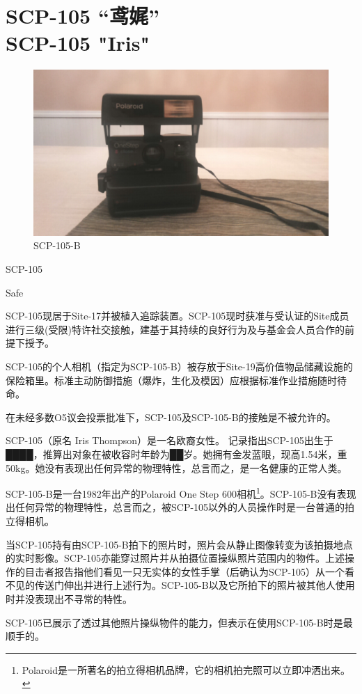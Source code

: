 \chapter[SCP-105 “鸢娓”]{
    SCP-105 “鸢娓”\\
    SCP-105 "Iris"
}

\label{chap:SCP-105}

\begin{figure}[H]
    \centering
    \includegraphics[width=0.5\linewidth]{images/SCP-105.jpg}
    \caption*{SCP-105-B}
\end{figure}

SCP-105

Safe

SCP-105现居于Site-17并被植入追踪装置。SCP-105现时获准与受认证的Site成员进行三级(受限)特许社交接触，建基于其持续的良好行为及与基金会人员合作的前提下授予。

SCP-105的个人相机（指定为SCP-105-B）被存放于Site-19高价值物品储藏设施的保险箱里。标准主动防御措施（爆炸，生化及模因）应根据标准作业措施随时待命。

在未经多数O5议会投票批准下，SCP-105及SCP-105-B的接触是不被允许的。

SCP-105（原名 Iris Thompson）是一名欧裔女性。 记录指出SCP-105出生于████，推算出对象在被收容时年龄为██岁。她拥有金发蓝眼，现高1.54米，重50kg。她没有表现出任何异常的物理特性，总言而之，是一名健康的正常人类。

SCP-105-B是一台1982年出产的Polaroid One Step 600相机\footnote{Polaroid是一所著名的拍立得相机品牌，它的相机拍完照可以立即冲洒出来。}。SCP-105-B没有表现出任何异常的物理特性，总言而之，被SCP-105以外的人员操作时是一台普通的拍立得相机。

当SCP-105持有由SCP-105-B拍下的照片时，照片会从静止图像转变为该拍摄地点的实时影像。SCP-105亦能穿过照片并从拍摄位置操纵照片范围内的物件。上述操作的目击者报告指他们看见一只无实体的女性手掌（后确认为SCP-105）从一个看不见的传送门伸出并进行上述行为。SCP-105-B以及它所拍下的照片被其他人使用时并没表现出不寻常的特性。

SCP-105已展示了透过其他照片操纵物件的能力，但表示在使用SCP-105-B时是最顺手的。

